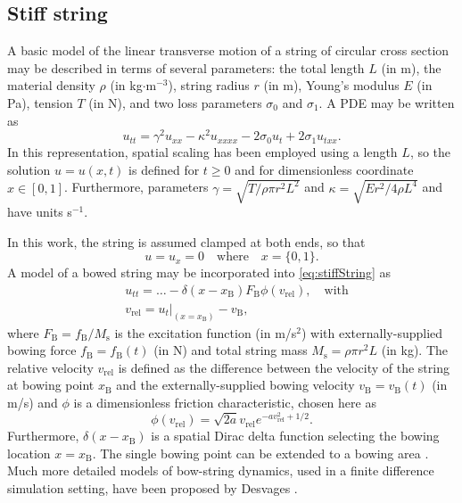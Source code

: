 \documentclass{article}
\begin{document}
\subsection{Stiff string}\label{subsec:stiffStringPDE}
A basic model of the linear transverse motion of a string of circular cross section may be described in terms of several parameters: the total length $L$ (in m), the material density $\rho$ (in kg$\cdot$m$^{-3}$), string radius $r$ (in m), Young's modulus $E$ (in Pa), tension $T$ (in N), and two loss parameters $\sigma_{0}$ and $\sigma_{1}$. %
A PDE may be written as
 \cite{Bilbao2009:NumericalSoundSynthesis} 
\begin{equation}\label{eq:stiffString}
    u_{tt} = \gamma^2 u_{xx}-\kappa^2u_{xxxx} - 2\sigma_0u_{t} + 2\sigma_1u_{txx}.
\end{equation}
In this representation, spatial scaling has been employed using a length $L$, so the solution $u = u(x,t)$ is defined for $t\geq 0$ and for dimensionless coordinate $x\in[0,1]$. Furthermore, parameters $\gamma = \sqrt{T/\rho\pi r^2 L^2}$ and $\kappa = \sqrt{Er^2/4\rho L^4}$ and have units s$^{-1}$.%

In this work, the string is assumed clamped at both ends, so that
\begin{equation}\label{boundary}
    u = u_x = 0 \quad \text{where} \quad x = \{0, 1\}.
\end{equation}
A model of a bowed string \cite{Bilbao2009:NumericalSoundSynthesis} may be incorporated into \eqref{eq:stiffString} as  
\begin{subequations}
\begin{align}
    \label{eq:bowedString} &u_{tt} = \hdots - \delta(x-x_\text{B})F_\text{B}\phi(v_\text{rel}), \quad \text{with} \\
    &v_\text{rel} = u_t |_{(x = x_\text{B})} - v_\text{B},\label{eq:relVelocity}
\end{align}
\end{subequations}
where $F_\text{B} = f_\text{B}/ M_\text{s}$ is the excitation function (in m/s$^2$) with externally-supplied bowing force $f_\text{B} = f_\text{B}(t)$ (in N) and total string mass $M_\text{s} = \rho\pi r^2 L$ (in kg). The relative velocity $v_\text{rel}$ is defined as the difference between the velocity of the string at bowing point $x_\text{B}$ and the externally-supplied bowing velocity $v_\text{B} = v_\text{B}(t)$ (in m/s) and $\phi$ is a dimensionless friction characteristic, chosen here as \cite{Bilbao2009:NumericalSoundSynthesis}
\begin{equation}
    \phi(v_\text{rel}) = \sqrt{2a}v_\text{rel} e^{-av_\text{rel}^2+1/2}.
\end{equation}
Furthermore, $\delta(x-x_\text{B})$ is a spatial Dirac delta function selecting the bowing location $x=x_\text{B}$. The single bowing point can be extended to a bowing area \cite{Bilbao2009:NumericalSoundSynthesis}. Much more detailed models of bow-string dynamics, used in a finite difference simulation setting, have been proposed by Desvages \cite{Desvages16}. 
\end{document}
